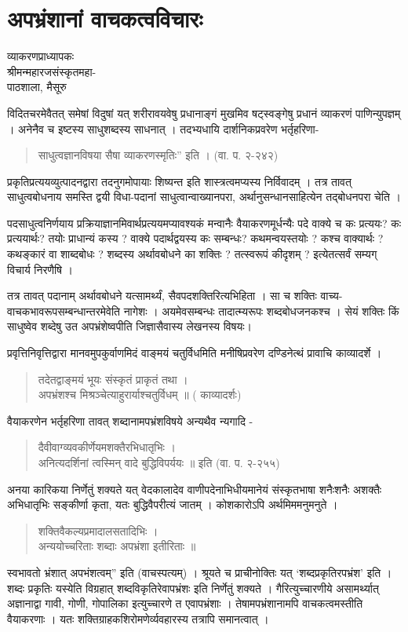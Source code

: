 \chapter{अपभ्रंशानां वाचकत्वविचारः}

\begin{center}
\smallskip

व्याकरणप्राध्यापकः\\
श्रीमन्महारजसंस्कृतमहा-\\
पाठशाला, मैसूरु
\addrule
\end{center}

विदितचरमेवैतत् समेषां विदुषां यत् शरीरावयवेषु प्रधानाङ्गं मुखमिव षट्स्वङ्गेषु प्रधानं व्याकरणं पाणिन्युपज्ञम् । अनेनैव च इष्टस्य साधुशब्दस्य साधनात् । तदभ्यधायि दार्शनिकप्रवरेण भर्तृहरिणा-
\begin{verse}
साधुत्वज्ञानविषया सैषा व्याकरणस्मृतिः” इति । (वा. प. २-२४२)
\end{verse}
प्रकृतिप्रत्ययव्युत्पादनद्वारा तदनुगमोपायाः शिष्यन्त इति शास्त्रत्वमप्यस्य निर्विवादम् । तत्र तावत् साधुत्वबोधनाय समस्ति द्वयी विधा-पदानां साधुत्वान्वाख्यानपरा, अर्थानुसन्धानसाहित्येन तद्बोधनपरा चेति । 

पदसाधुत्वनिर्णयाय प्रक्रियाज्ञानमिवार्थप्रत्ययमप्यावश्यकं मन्वानैः वैयाकरणमूर्धन्यैः पदे वाक्ये च कः प्रत्ययः? कः प्रत्ययार्थः? तयोः प्राधान्यं कस्य ? वाक्ये पदार्थद्वयस्य कः सम्बन्धः? कथमन्वयस्तयोः ? कश्च वाक्यार्थः ? कथङ्कारं वा शाब्दबोधः ? शब्दस्य अर्थावबोधने का शक्तिः ? तत्स्वरूपं कीदृशम् ? इत्येतत्सर्वं सम्यग् विचार्य निरणैषि ।  

तत्र तावत् पदानाम् अर्थावबोधने यत्सामर्थ्यं, सैवपदशक्तिरित्यभिहिता । सा च शक्तिः वाच्य-वाचकभावरूपसम्बन्धान्तरमेवेति नागेशः । अयमेवसम्बन्धः तादात्म्यरूपः शब्दबोधजनकश्च । सेयं शक्तिः किं साधुष्वेव शब्देषु उत अपभ्रंशेष्वपीति जिज्ञासैवास्य लेखनस्य विषयः।

प्रवृत्तिनिवृत्तिद्वारा मानवमुपकुर्वाणमिदं वाङ्मयं चतुर्विधमिति मनीषिप्रवरेण दण्डिनेत्थं प्रावाचि काव्यादर्शे ।
\begin{verse}
तदेतद्वाङ्मयं भूयः संस्कृतं प्राकृतं तथा ।\\
अपभ्रंशश्च मिश्रञ्चेत्याहुरार्याश्चतुर्विधम् ॥ ( काव्यादर्शः)
\end{verse}
वैयाकरणेन भर्तृहरिणा तावत् शब्दानामपभ्रंशविषये अन्यथैव न्यगादि -
\begin{verse}
दैवीवाग्व्यवकीर्णेयमशक्तैरभिधातृभिः ।\\
अनित्यदर्शिनां त्वस्मिन् वादे बुद्धिविपर्ययः ॥ इति (वा. प. २-२५५)
\end{verse}
अनया कारिकया निर्णेतुं शक्यते यत् वेदकालादेव वाणीपदेनाभिधीयमानेयं संस्कृतभाषा शनैःशनैः अशक्तैः अभिधातृभिः सङ्कीर्णा कृता, यतः बुद्धिवैपरीत्यं जातम् । कोशकारोऽपि अर्थमिममनुमनुते ।
\begin{verse}
शक्तिवैकल्यप्रमादालसतादिभिः ।\\
अन्ययोच्चरिताः शब्दाः अपभ्रंशा इतीरिताः ॥ 
\end{verse}
स्वभावतो भ्रंशात् अपभंशत्वम्” इति (वाचस्पत्यम्) । श्रूयते च प्राचीनोक्तिः यत् ‘शब्दप्रकृतिरपभ्रंश’ इति । शब्दः प्रकृतिः यस्येति विग्रहात् शब्दविकृतिरेवापभ्रंशः इति निर्णेतुं शक्यते । गैरित्युच्चारणीये असामर्थ्यात् अज्ञानाद्वा गावी, गोणी, गोपालिका इत्युच्चारणे त एवापभ्रंशाः । तेषामपभ्रंशानामपि वाचकत्वमस्तीति वैयाकरणाः । यतः शक्तिग्राहकशिरोमणेर्व्यवहारस्य तत्रापि समानत्वात् ।

